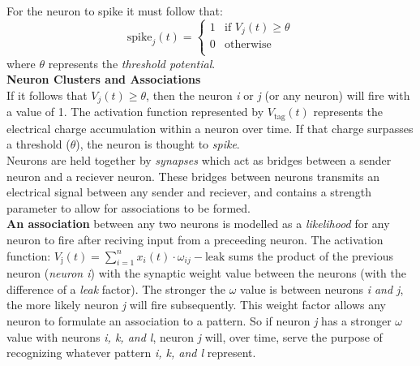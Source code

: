 \documentclass{article}
\begin{document}
For the neuron to spike it must follow that: \\
\begin{equation} 
	\text{spike}_j(t) = 
	\begin{cases}
		1 & \text{if } V_j(t) \geq \theta \\ 
		0 & \text{otherwise} \\  
	\end{cases} 
\end{equation}
where \(\theta\) represents the \textit{threshold potential}. \\[0.5em] 

\textbf{Neuron Clusters and Associations}\\[1em]
If it follows that \(V_j(t) \geq \theta\), then the neuron \textit{i} or \textit{j} (or any neuron) will fire with a value of 1. The activation function represented by \(V_{\text{tag}}(t)\) represents the electrical charge accumulation within a neuron over time. If that charge surpasses a threshold (\(\theta\)), the neuron is thought to \textit{spike}.\\[0.5em] 
Neurons are held together by \textit{synapses} which act as bridges between a sender neuron and a reciever neuron. These bridges between neurons transmits an electrical signal between any sender and reciever, and contains a strength parameter to allow for associations to be formed. \\[1em] 
\textbf{An association} between any two neurons is modelled as a \textit{likelihood} for any neuron to fire after reciving input from a preceeding neuron. The activation function: \(V_{\text{j}}(t) = \sum_{i=1}^{n}x_i(t)\cdot \omega_{ij} - \text{leak}\) sums the product of the previous neuron (\textit{neuron i}) with the synaptic weight value between the neurons  (with the difference of a \textit{leak} factor). The stronger the \(\omega\) value is between neurons \textit{i and j}, the more likely neuron \textit{j} will fire subsequently. This weight factor allows any neuron to formulate an association to a pattern. So if neuron \textit{j} has a stronger \(\omega\) value with neurons \textit{i, k, and l}, neuron \textit{j} will, over time, serve the purpose of recognizing whatever pattern \textit{i, k, and l} represent.  
\end{document}
